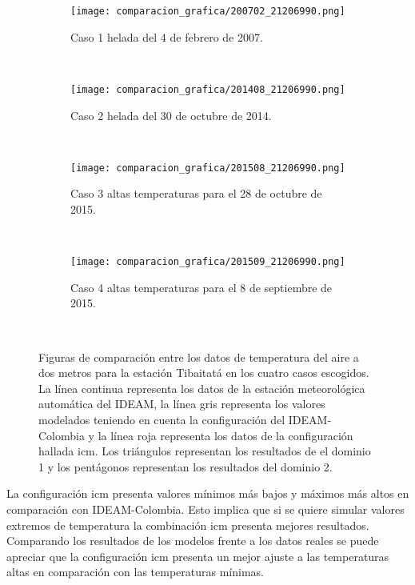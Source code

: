 \begin{figure}[H]
    
\begin{subfigure}[normla]{0.4\textwidth}
\caption{Caso 1 helada del 4 de febrero de 2007.}
\label{caso1_tiba_wrf}
\texttt{[image: comparacion\_grafica/200702\_21206990.png]}
\end{subfigure}
~
\begin{subfigure}[normla]{0.4\textwidth}
\caption{Caso 2 helada del 30 de octubre de 2014.}
\label{caso2_tiba_wrf}
\texttt{[image: comparacion\_grafica/201408\_21206990.png]}
\end{subfigure}
~
\centering
\begin{subfigure}[normla]{0.4\textwidth}
\caption{Caso 3 altas temperaturas para el 28 de octubre de 2015.}
\label{caso3_tiba_wrf}
\texttt{[image: comparacion\_grafica/201508\_21206990.png]}
\end{subfigure}
~
\centering
\begin{subfigure}[normla]{0.4\textwidth}
\caption{Caso 4 altas temperaturas para el 8 de septiembre de 2015.}
\label{caso4_tiba_wrf}
\texttt{[image: comparacion\_grafica/201509\_21206990.png]}
\end{subfigure}
~

    \caption{Figuras de comparación entre los datos de temperatura del aire a dos metros para la estación Tibaitatá en los cuatro casos escogidos. La línea continua representa los datos de la estación meteorológica automática del IDEAM, la línea gris representa los valores modelados teniendo en cuenta la configuración del IDEAM-Colombia y la línea roja representa los datos de la configuración hallada icm. Los triángulos representan los resultados de el dominio 1 y los pentágonos representan los resultados del dominio 2.}
    \label{fig:wrf_temp_tibaitata}

\end{figure}



La configuración icm presenta valores mínimos más bajos y máximos más altos en comparación con IDEAM-Colombia. Esto implica que si se quiere simular valores extremos de temperatura la combinación icm presenta mejores resultados.\\

Comparando los resultados de los modelos frente a los datos reales se puede apreciar que la configuración icm presenta un mejor ajuste a las temperaturas altas en comparación con las temperaturas mínimas.\\


